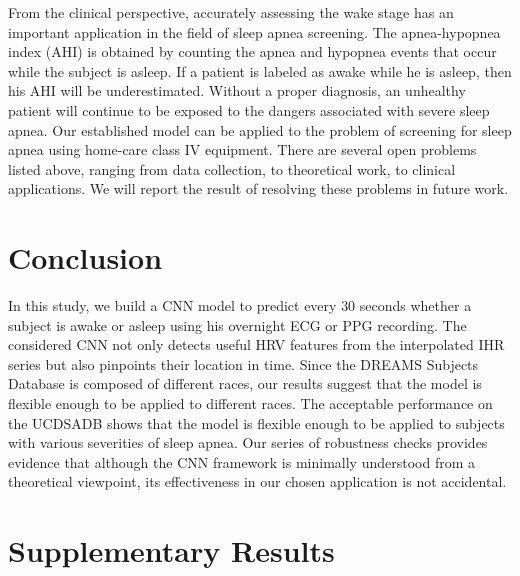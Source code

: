 \documentclass[10pt,a4paper,english]{amsart}
\begin{document}
From the clinical perspective, accurately assessing the wake stage has an important application in the field of sleep apnea screening. The apnea-hypopnea index (AHI) is obtained by counting the apnea and hypopnea events that occur while the subject is asleep. If a patient is labeled as awake while he is asleep, then his AHI will be underestimated.  Without a proper diagnosis, an unhealthy patient will continue to be exposed to the dangers associated with severe sleep apnea.
Our established model can be applied to the problem of screening for sleep apnea using home-care class IV equipment. 
There are several open problems listed above, ranging from data collection, to theoretical work, to clinical applications. We will report the result of resolving these problems in future work.

\section{Conclusion}

In this study, we build a CNN model to predict every $30$ seconds whether a subject is awake or asleep using his overnight ECG or PPG recording. The considered CNN not only detects useful HRV features from the interpolated IHR series but also pinpoints their location in time. 
Since the DREAMS Subjects Database is composed of different races, our results suggest that the model is flexible enough to be applied to different races. 
The acceptable performance on the UCDSADB shows that the model is flexible enough to be applied to subjects with various severities of sleep apnea.
Our series of robustness checks provides evidence that although the CNN framework is minimally understood from a theoretical viewpoint, its effectiveness in our chosen application is not accidental.


\bigskip


 

\clearpage

\appendix
\section{Supplementary Results}
\end{document}
